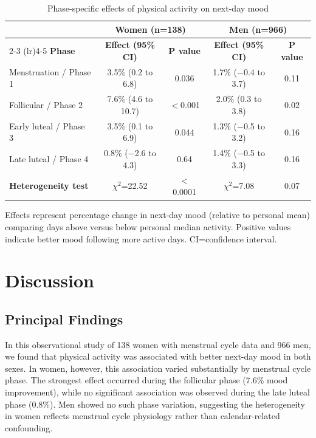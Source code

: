 \documentclass[12pt]{article}
\begin{document}
\begin{table}[htbp]
\centering
\caption{Phase-specific effects of physical activity on next-day mood}
\label{tab:results}
\begin{tabular}{lcccc}
\toprule
 & \multicolumn{2}{c}{\textbf{Women (n=138)}} & \multicolumn{2}{c}{\textbf{Men (n=966)}} \\
\cmidrule(lr){2-3} \cmidrule(lr){4-5}
\textbf{Phase} & \textbf{Effect (95\% CI)} & \textbf{P value} & \textbf{Effect (95\% CI)} & \textbf{P value} \\
\midrule
Menstruation / Phase 1 & 3.5\% (0.2 to 6.8) & 0.036 & 1.7\% ($-$0.4 to 3.7) & 0.11 \\
Follicular / Phase 2 & 7.6\% (4.6 to 10.7) & $<$0.001 & 2.0\% (0.3 to 3.8) & 0.02 \\
Early luteal / Phase 3 & 3.5\% (0.1 to 6.9) & 0.044 & 1.3\% ($-$0.5 to 3.2) & 0.16 \\
Late luteal / Phase 4 & 0.8\% ($-$2.6 to 4.3) & 0.64 & 1.4\% ($-$0.5 to 3.3) & 0.16 \\
\midrule
\textbf{Heterogeneity test} & $\chi^2$=22.52 & $<$0.0001 & $\chi^2$=7.08 & 0.07 \\
\bottomrule
\end{tabular}
\vspace{0.5em}

\footnotesize
Effects represent percentage change in next-day mood (relative to personal mean) comparing days above versus below personal median activity. Positive values indicate better mood following more active days. CI=confidence interval.
\end{table}

\section*{Discussion}

\subsection*{Principal Findings}

In this observational study of 138 women with menstrual cycle data and 966 men, we found that physical activity was associated with better next-day mood in both sexes. In women, however, this association varied substantially by menstrual cycle phase. The strongest effect occurred during the follicular phase (7.6\% mood improvement), while no significant association was observed during the late luteal phase (0.8\%). Men showed no such phase variation, suggesting the heterogeneity in women reflects menstrual cycle physiology rather than calendar-related confounding.
\end{document}
